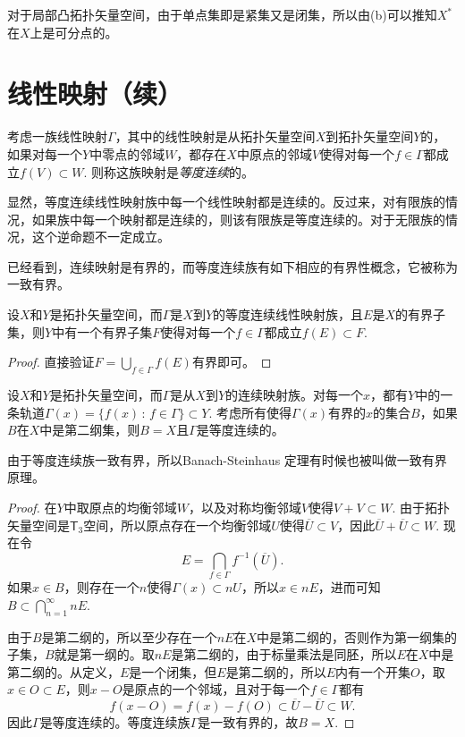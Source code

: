 对于局部凸拓扑矢量空间，由于单点集即是紧集又是闭集，所以由(b)可以推知$X^*$在$X$上是可分点的。

\section{线性映射（续）}

\begin{para}
	考虑一族线性映射$\Gamma$，其中的线性映射是从拓扑矢量空间$X$到拓扑矢量空间$Y$的，如果对每一个$Y$中零点的邻域$W$，都存在$X$中原点的邻域$V$使得对每一个$f\in \Gamma$都成立$f(V)\subset W$. 则称这族映射是\textit{等度连续}的。

	显然，等度连续线性映射族中每一个线性映射都是连续的。反过来，对有限族的情况，如果族中每一个映射都是连续的，则该有限族是等度连续的。对于无限族的情况，这个逆命题不一定成立。
\end{para}

已经看到，连续映射是有界的，而等度连续族有如下相应的有界性概念，它被称为一致有界。

\begin{pro}
设$X$和$Y$是拓扑矢量空间，而$\Gamma$是$X$到$Y$的等度连续线性映射族，且$E$是$X$的有界子集，则$Y$中有一个有界子集$F$使得对每一个$f\in \Gamma$都成立$f(E)\subset F$.
\end{pro}

\begin{proof}
	直接验证$F=\bigcup_{f\in \Gamma}f(E)$有界即可。
\end{proof}

\begin{thm}
	设$X$和$Y$是拓扑矢量空间，而$\Gamma$是从$X$到$Y$的连续映射族。对每一个$x$，都有$Y$中的一条轨道$\Gamma(x)=\{f(x)\,:\, f\in \Gamma\}\subset Y$. 考虑所有使得$\Gamma(x)$有界的$x$的集合$B$，如果$B$在$X$中是第二纲集，则$B=X$且$\Gamma$是等度连续的。
\end{thm}

由于等度连续族一致有界，所以Banach-Steinhaus 定理有时候也被叫做一致有界原理。

\begin{proof}
	在$Y$中取原点的均衡邻域$W$，以及对称均衡邻域$V$使得$V+V\subset W$. 由于拓扑矢量空间是$\mathsf{T}_3$空间，所以原点存在一个均衡邻域$U$使得$\overline{U}\subset V$，因此$\overline{U}+\overline{U}\subset W$. 现在令
	\[
	E=\bigcap_{f\in \Gamma}f^{-1}(\overline{U}).
	\]
	如果$x\in B$，则存在一个$n$使得$\Gamma(x)\subset nU$，所以$x\in n E$，进而可知$B\subset \bigcap_{n=1}^\infty nE$.

	由于$B$是第二纲的，所以至少存在一个$nE$在$X$中是第二纲的，否则作为第一纲集的子集，$B$就是第一纲的。取$nE$是第二纲的，由于标量乘法是同胚，所以$E$在$X$中是第二纲的。从定义，$E$是一个闭集，但$E$是第二纲的，所以$E$内有一个开集$O$，取$x\in O\subset E$，则$x-O$是原点的一个邻域，且对于每一个$f\in \Gamma$都有
	\[
	f(x-O)=f(x)-f(O)\subset \overline{U}-\overline{U}\subset W.
	\]
	因此$\Gamma$是等度连续的。等度连续族$\Gamma$是一致有界的，故$B=X$.
\end{proof}

